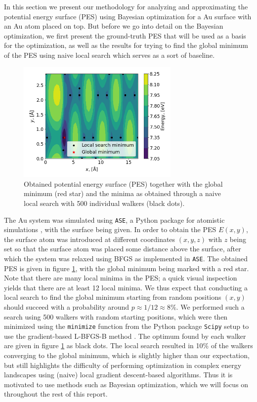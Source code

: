 \documentclass[11pt,a4paper]{article}
\begin{document}
In this section we present our methodology for analyzing and approximating the potential energy surface (PES) using Bayesian optimization for a Au surface with an Au atom placed on top. But before we go into detail on the Bayesian optimization, we first present the ground-truth PES that will be used as a basis for the optimization, as well as the results for trying to find the global minimum of the PES using naive local search which serves as a sort of baseline.


\begin{figure}[ht]
    \centering
    \includegraphics[width=0.7\textwidth]{figures/task12.png}
    \caption{Obtained potential energy surface (PES) together with the global minimum (red star) and the minima as obtained through a naive local search with 500 individual walkers (black dots). }
    \label{fig:pes}
\end{figure}

The Au system was simulated using \texttt{ASE}, a Python package for atomistic simulations \cite{ASE}, with the surface being given. In order to obtain the PES $E(x,y)$, the surface atom was introduced at different coordinates $(x,y,z)$ with $z$ being set so that the surface atom was placed some distance above the surface, after which the system was relaxed using BFGS as implemented in \texttt{ASE}. The obtained PES is given in figure \ref{fig:pes}, with the global minimum being marked with a red star. Note that there are many local minima in the PES; a quick visual inspection yields that there are at least 12 local minima. We thus expect that conducting a local search to find the global minimum starting from random positions $(x,y)$ should succeed with a probability around $p \approx 1/12 \approx 8\%$. We performed such a search using 500 walkers with random starting positions, which were then minimized using the \texttt{minimize} function from the Python package \texttt{Scipy} setup to use the gradient-based L-BFGS-B method \cite{scipy_min}. The optimum found by each walker are given in figure \ref{fig:pes} as black dots. The local search resulted in 10\% of the walkers converging to the global minimum, which is slightly higher than our expectation, but still highlights the difficulty of performing optimization in complex energy landscapes using (naive) local gradient descent-based algorithms. Thus it is motivated to use methods such as Bayesian optimization, which we will focus on throughout the rest of this report. 
\end{document}
